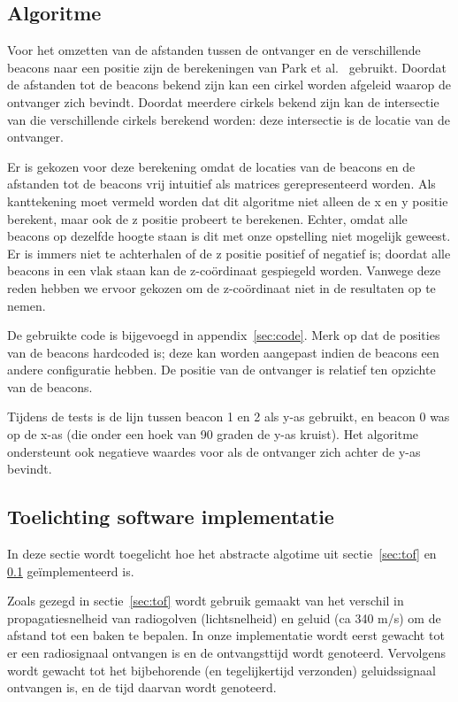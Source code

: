 \documentclass[a4paper,10pt]{article}
\begin{document}
\subsection{Algoritme} \label{sec:alg}
Voor het omzetten van de afstanden tussen de ontvanger en de verschillende beacons naar een positie zijn de berekeningen van Park et al.~\cite{park2011beacon} gebruikt. Doordat de afstanden tot de beacons bekend zijn kan een cirkel worden afgeleid waarop de ontvanger zich bevindt. Doordat meerdere cirkels bekend zijn kan de intersectie van die verschillende cirkels berekend worden: deze intersectie is de locatie van de ontvanger.

Er is gekozen voor deze berekening omdat de locaties van de beacons en de afstanden tot de beacons vrij intuitief als matrices gerepresenteerd worden. Als kanttekening moet vermeld worden dat dit algoritme niet alleen de x en y positie berekent, maar ook de z positie probeert te berekenen. Echter, omdat alle beacons op dezelfde hoogte staan is dit met onze opstelling niet mogelijk geweest. Er is immers niet te achterhalen of de z positie positief of negatief is; doordat alle beacons in een vlak staan kan de z-co\"ordinaat gespiegeld worden. Vanwege deze reden hebben we ervoor gekozen om de z-co\"ordinaat niet in de resultaten op te nemen.

De gebruikte code is bijgevoegd in appendix~\ref{sec:code}. Merk op dat de posities van de beacons hardcoded is; deze kan worden aangepast indien de beacons een andere configuratie hebben. De positie van de ontvanger is relatief ten opzichte van de beacons.

Tijdens de tests is de lijn tussen beacon 1 en 2 als y-as gebruikt, en beacon 0 was op de x-as (die onder een hoek van 90 graden de y-as kruist). Het algoritme ondersteunt ook negatieve waardes voor als de ontvanger zich achter de y-as bevindt.

\subsection{Toelichting software implementatie}
In deze sectie wordt toegelicht hoe het abstracte algotime uit sectie~\ref{sec:tof} en \ref{sec:alg} ge\"implementeerd is.

Zoals gezegd in sectie~\ref{sec:tof} wordt gebruik gemaakt van het verschil in propagatiesnelheid van radiogolven (lichtsnelheid) en geluid (ca 340 m/s) om de afstand tot een baken te bepalen. In onze implementatie wordt eerst gewacht tot er een radiosignaal ontvangen is en de ontvangsttijd wordt genoteerd. Vervolgens wordt gewacht tot het bijbehorende (en tegelijkertijd verzonden) geluidssignaal ontvangen is, en de tijd daarvan wordt genoteerd.
\end{document}
